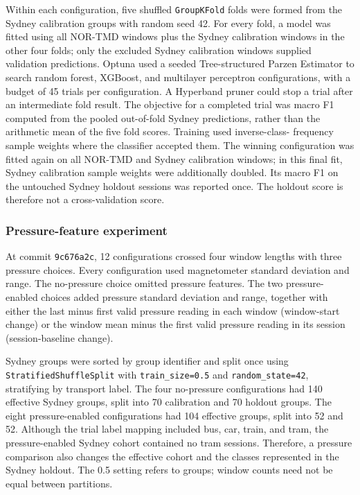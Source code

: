 Within each configuration, five shuffled \texttt{GroupKFold} folds were formed
from the Sydney calibration groups with random seed 42. For every fold, a model
was fitted using all NOR-TMD windows plus the Sydney calibration windows in
the other four folds; only the excluded Sydney calibration windows supplied
validation predictions. Optuna used a seeded Tree-structured Parzen Estimator
to search random forest, XGBoost, and multilayer perceptron configurations,
with a budget of 45 trials per configuration. A Hyperband pruner could stop a
trial after an intermediate fold result. The objective for a completed trial
was macro F1 computed from the pooled out-of-fold Sydney predictions, rather
than the arithmetic mean of the five fold scores. Training used inverse-class-
frequency sample weights where the classifier accepted them. The winning
configuration was fitted again on all NOR-TMD and Sydney calibration windows;
in this final fit, Sydney calibration sample weights were additionally doubled.
Its macro F1 on the untouched Sydney holdout sessions was reported once. The
holdout score is therefore not a cross-validation score.

\subsubsection{Pressure-feature experiment}

At commit \texttt{9c676a2c}, 12 configurations crossed four window lengths
with three pressure choices. Every configuration used magnetometer standard
deviation and range. The no-pressure choice omitted pressure features. The two
pressure-enabled choices added pressure standard deviation and range, together
with either the last minus first valid pressure reading in each window
(window-start change) or the window mean minus the first valid pressure reading
in its session (session-baseline change).

Sydney groups were sorted by group identifier and split once using
\texttt{StratifiedShuffleSplit} with \texttt{train\_size=0.5} and
\texttt{random\_state=42}, stratifying by transport label. The four no-pressure
configurations had 140 effective Sydney groups, split into 70 calibration and
70 holdout groups. The eight pressure-enabled configurations had 104 effective
groups, split into 52 and 52. Although the trial label mapping included bus,
car, train, and tram, the pressure-enabled Sydney cohort contained no tram
sessions. Therefore, a pressure comparison also changes the effective cohort
and the classes represented in the Sydney holdout. The 0.5 setting refers to
groups; window counts need not be equal between partitions.

